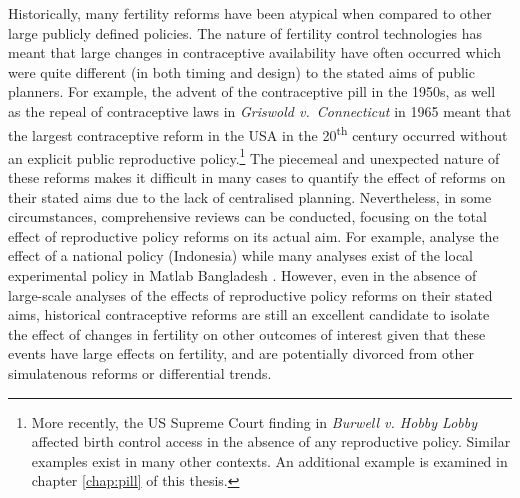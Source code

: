 Historically, many fertility reforms have been atypical when compared to other 
large publicly defined policies.  The nature of fertility control technologies 
has meant that large changes in contraceptive availability have often occurred
which were quite different (in both timing and design) to the stated aims of
public planners.  For example, the advent of the contraceptive pill in the 
1950s, as well as the repeal of contraceptive laws in \emph{Griswold v.\ 
Connecticut} in 1965 \citep{Bailey2013} meant that the largest contraceptive 
reform in the USA in the 20\textsuperscript{th} century occurred without an 
explicit public reproductive policy.\footnote{More recently, the US Supreme 
Court finding in \emph{Burwell v. Hobby Lobby} affected birth control access 
in the absence of any reproductive policy.  Similar examples exist in many other 
contexts.  An additional example is examined in chapter \ref{chap:pill} of this
thesis.} The piecemeal and unexpected nature of these reforms makes it difficult 
in many cases to quantify the effect of reforms on their stated aims due to the
lack of centralised planning. Nevertheless, in some circumstances, comprehensive
reviews can be conducted, focusing on the total effect of reproductive policy
reforms on its actual aim.  For example, \citet{MolyneuxGertler2000} analyse 
the effect of a national policy (Indonesia) while many analyses exist of the 
local experimental policy in Matlab Bangladesh \citep{JoshiSchultz2013}. However,
even in the absence of large-scale analyses of the effects of reproductive policy 
reforms on their stated aims, historical contraceptive reforms are still an 
excellent candidate to isolate the effect of changes in fertility on other
outcomes of interest given that these events have large effects on fertility,
and are potentially divorced from other simulatenous reforms or differential 
trends.

